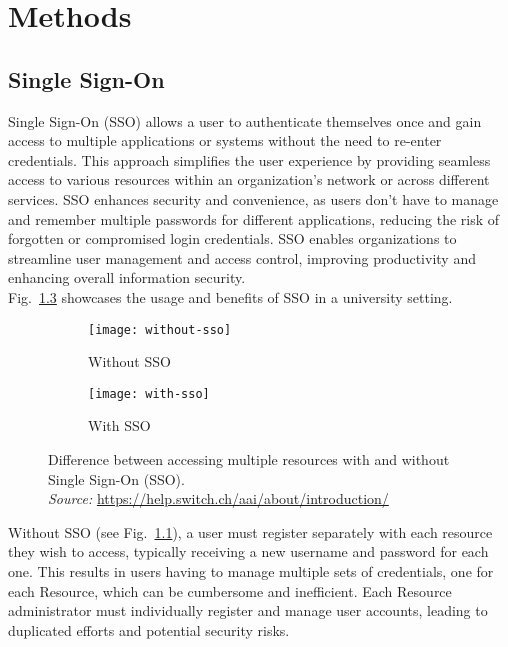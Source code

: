 \chapter{Methods}\label{chapter:methods}

\section{Single Sign-On}

Single Sign-On (SSO) allows a user to authenticate themselves once and gain
access to multiple applications or systems without the need to re-enter
credentials. This approach simplifies the user experience by providing seamless
access to various resources within an organization's network or across different
services. SSO enhances security and convenience, as users don't have to manage
and remember multiple passwords for different applications, reducing the risk of
forgotten or compromised login credentials. SSO enables organizations to
streamline user management and access control, improving productivity and
enhancing overall information security. \\

Fig.~\ref{fig:sso} showcases the usage and benefits of SSO in a university
setting.

\begin{figure}[htb]
    \centering
    \begin{subfigure}{0.49\textwidth}
      \centering
      \texttt{[image: without-sso]}
      \caption{Without SSO}
      \label{fig:without-sso}
    \end{subfigure}
    \hfill
    \begin{subfigure}{0.49\textwidth}
      \centering
      \texttt{[image: with-sso]}
      \caption{With SSO}
      \label{fig:with-sso}
    \end{subfigure}
      \caption{Difference between accessing multiple resources with and without
      Single Sign-On (SSO). \\ \textit{Source:}
      \url{https://help.switch.ch/aai/about/introduction/}} 
      \label{fig:sso}
\end{figure}

Without SSO (see Fig.~\ref{fig:without-sso}), a user must register separately
with each resource they wish to access, typically receiving a new username and
password for each one. This results in users having to manage multiple sets of
credentials, one for each Resource, which can be cumbersome and inefficient.
Each Resource administrator must individually register and manage user accounts,
leading to duplicated efforts and potential security risks.


